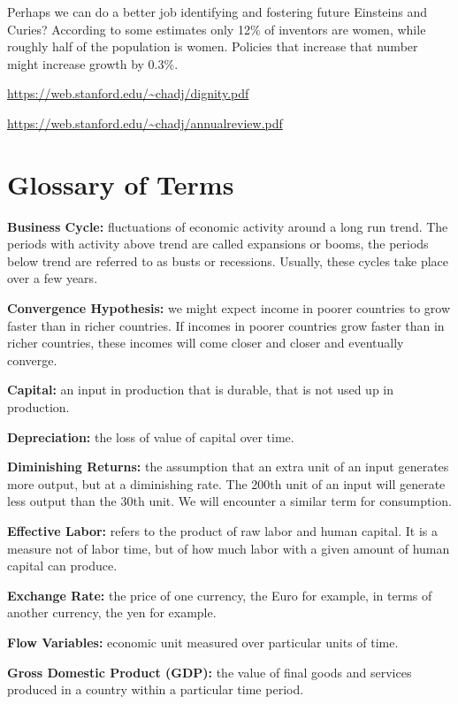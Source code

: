 \documentclass[
]{book}
\begin{document}
Perhaps we can do a better job identifying and fostering future Einsteins and Curies? According to some estimates only 12\% of inventors are women, while roughly half of the population is women. Policies that increase that number might increase growth by 0.3\%.

\url{https://web.stanford.edu/~chadj/dignity.pdf}

\url{https://web.stanford.edu/~chadj/annualreview.pdf}

\hypertarget{glossary-of-terms-1}{%
\section{Glossary of Terms}\label{glossary-of-terms-1}}

\textbf{Business Cycle:} fluctuations of economic activity around a long run trend. The periods with activity above trend are called expansions or booms, the periods below trend are referred to as busts or recessions. Usually, these cycles take place over a few years.

\textbf{Convergence Hypothesis:} we might expect income in poorer countries to grow faster than in richer countries. If incomes in poorer countries grow faster than in richer countries, these incomes will come closer and closer and eventually converge.

\textbf{Capital:} an input in production that is durable, that is not used up in production.

\textbf{Depreciation:} the loss of value of capital over time.

\textbf{Diminishing Returns:} the assumption that an extra unit of an input generates more output, but at a diminishing rate. The 200th unit of an input will generate less output than the 30th unit. We will encounter a similar term for consumption.

\textbf{Effective Labor:} refers to the product of raw labor and human capital. It is a measure not of labor time, but of how much labor with a given amount of human capital can produce.

\textbf{Exchange Rate:} the price of one currency, the Euro for example, in terms of another currency, the yen for example.

\textbf{Flow Variables:} economic unit measured over particular units of time.

\textbf{Gross Domestic Product (GDP):} the value of final goods and services produced in a country within a particular time period.
\end{document}
